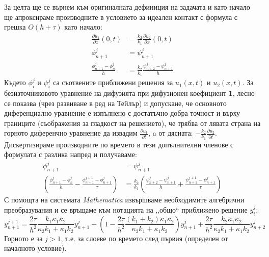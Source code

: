 За целта ще се върнем към оригиналната дефиниция на задачата и като начало ще апроксираме производните в условието за идеален контакт с формула с  грешка $O(h+\tau)$ като начало:
\begin{align*}
	\frac{\partial u_1}{\partial x} (0, t)  & = \frac{k_2}{k_1} \frac{\partial u_2}{\partial x} (0, t)     \\
	\phi_{n+1}^{j}                          & = \psi_{n+1}^{j}                                             \\
	\frac{\phi_{n+1}^{j} - \phi_{n}^{j}}{h} & =  \frac{k_2}{k_1} \frac{\psi_{n+2}^{j} - \psi_{n+1}^{j}}{h} 
\end{align*}
Където $\phi_i^j$ и $\psi_i^j$ са съотвените приближени решения за $u_1(x,t)$ и $u_2(x,t)$.
За безизточниковото уравнение на дифузията при дифузионен коефициент \textbf{1}, лесно се показва (чрез развиване в ред на Тейлър) и допускане, че основното диференциално уравнение
е изпълнено с достатъчно добра точност и върху границите (съображения за гладкост на решението), че трябва от лявата страна на горното диференчно уравнение да извадим $\frac{\partial u_1}{\partial t}$, a от дясната: $-\frac{k_2}{k_1}\frac{\partial u_2}{\partial t}$.
Дискертизираме производните по времето в тези допълнителни членове с формулата с разлика напред и получаваме:
\begin{align*}
	\phi_{n+1}^{j}                                                                                      & = \psi_{n+1}^{j}                                                                                                          \\
	\left(\frac{\phi_{n+1}^{j} - \phi_{n}^{j}}{h} - \frac{\phi_{n+1}^{j+1}-\phi_{n+1}^{j}}{\tau}\right) & =  \frac{k_2}{k_1} \left(\frac{\psi_{n+2}^{j} - \psi_{n+1}^{j}}{h} + \frac{ \psi_{n+1}^{j+1}-\psi_{n+1}^{j}}{\tau}\right) 
\end{align*}
С помощта на системата \textit{Mathematica} извършваме необходимите алгебрични преобразувания и се връщаме към нотацията на ,,общо`` приближено решение $y_i^j$:
\begin{equation}
	y_{n+1}^{j+1} = \frac{2 \tau}{h^2} \frac{k_1 \kappa_1 \kappa_2 }{\kappa_2 k_1 + \kappa_1 k_2} y_{n+1}^j + \left( 1 - \frac{2 \tau}{h^2}  \frac{(k_1 + k_2) \kappa_1 \kappa_2 }{\kappa_2 k_1 + \kappa_1 k_2} \right) y_{n+1}^j + \frac{2 \tau}{h^2} \frac{k_2 \kappa_1 \kappa_2 }{\kappa_2 k_1 + \kappa_1 k_2} y_{n+2}^j
\end{equation}
Горното е за $j > 1$, т.е. за слоеве по времето след първия (определен от началното условие).
